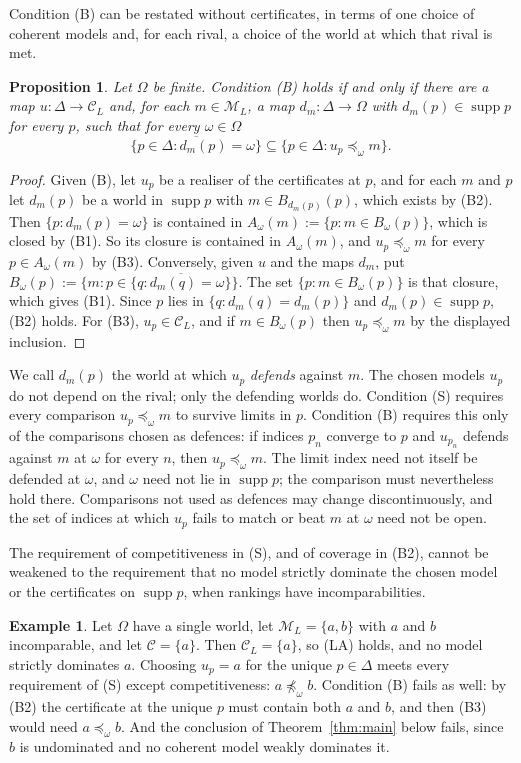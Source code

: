 \documentclass[11pt]{article}
\newtheorem{proposition}[theorem]{Proposition}
\theoremstyle{definition}
\newtheorem{example}[theorem]{Example}
\theoremstyle{remark}
\newcommand{\M}{\mathcal M}
\newcommand{\C}{\mathcal C}
\newcommand{\supp}{\operatorname{supp}}
\begin{document}
Condition (B) can be restated without certificates, in terms of one choice of coherent models and, for each rival, a choice of the world at which that rival is met.
\begin{proposition}\label{prop:defence}
Let $\Omega$ be finite. Condition (B) holds if and only if there are a map $u:\Delta\to\C_L$ and, for each $m\in\M_L$, a map $d_m:\Delta\to\Omega$ with $d_m(p)\in\supp p$ for every $p$, such that for every $\omega\in\Omega$
\[
 \overline{\{p\in\Delta:d_m(p)=\omega\}}\subseteq\{p\in\Delta:u_p\preceq_\omega m\}.
\]
\end{proposition}
\begin{proof}
Given (B), let $u_p$ be a realiser of the certificates at $p$, and for each $m$ and $p$ let $d_m(p)$ be a world in $\supp p$ with $m\in B_{d_m(p)}(p)$, which exists by (B2). Then $\{p:d_m(p)=\omega\}$ is contained in $A_\omega(m):=\{p:m\in B_\omega(p)\}$, which is closed by (B1). So its closure is contained in $A_\omega(m)$, and $u_p\preceq_\omega m$ for every $p\in A_\omega(m)$ by (B3). Conversely, given $u$ and the maps $d_m$, put $B_\omega(p):=\{m:p\in\overline{\{q:d_m(q)=\omega\}}\}$. The set $\{p:m\in B_\omega(p)\}$ is that closure, which gives (B1). Since $p$ lies in $\{q:d_m(q)=d_m(p)\}$ and $d_m(p)\in\supp p$, (B2) holds. For (B3), $u_p\in\C_L$, and if $m\in B_\omega(p)$ then $u_p\preceq_\omega m$ by the displayed inclusion.
\end{proof}
We call $d_m(p)$ the world at which $u_p$ \emph{defends} against $m$. The chosen models $u_p$ do not depend on the rival; only the defending worlds do. Condition (S) requires every comparison $u_p\preceq_\omega m$ to survive limits in $p$. Condition (B) requires this only of the comparisons chosen as defences: if indices $p_n$ converge to $p$ and $u_{p_n}$ defends against $m$ at $\omega$ for every $n$, then $u_p\preceq_\omega m$. The limit index need not itself be defended at $\omega$, and $\omega$ need not lie in $\supp p$; the comparison must nevertheless hold there. Comparisons not used as defences may change discontinuously, and the set of indices at which $u_p$ fails to match or beat $m$ at $\omega$ need not be open.

The requirement of competitiveness in (S), and of coverage in (B2), cannot be weakened to the requirement that no model strictly dominate the chosen model or the certificates on $\supp p$, when rankings have incomparabilities.
\begin{example}\label{ex:incomparable}
Let $\Omega$ have a single world, let $\M_L=\{a,b\}$ with $a$ and $b$ incomparable, and let $\C=\{a\}$. Then $\C_L=\{a\}$, so (LA) holds, and no model strictly dominates $a$. Choosing $u_p=a$ for the unique $p\in\Delta$ meets every requirement of (S) except competitiveness: $a\not\preceq_\omega b$. Condition (B) fails as well: by (B2) the certificate at the unique $p$ must contain both $a$ and $b$, and then (B3) would need $a\preceq_\omega b$. And the conclusion of Theorem~\ref{thm:main} below fails, since $b$ is undominated and no coherent model weakly dominates it.
\end{example}
\end{document}
